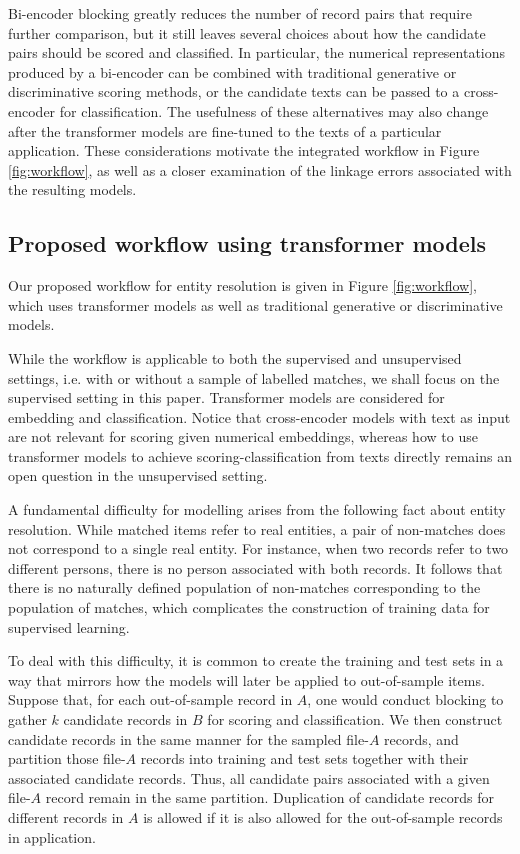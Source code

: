 Bi-encoder blocking greatly reduces the number of record pairs that require further comparison, but it still leaves several choices about how the candidate pairs should be scored and classified. In particular, the numerical representations produced by a bi-encoder can be combined with traditional generative or discriminative scoring methods, or the candidate texts can be passed to a cross-encoder for classification. The usefulness of these alternatives may also change after the transformer models are fine-tuned to the texts of a particular application. These considerations motivate the integrated workflow in Figure \ref{fig:workflow}, as well as a closer examination of the linkage errors associated with the resulting models.


\subsection{Proposed workflow using transformer models}
\label{sec:proposal}

Our proposed workflow for entity resolution is given in Figure \ref{fig:workflow}, which uses transformer models as well as traditional generative or discriminative models.

While the workflow is applicable to both the supervised and unsupervised settings, i.e. with or without a sample of labelled matches, we shall focus on the supervised setting in this paper. Transformer models are considered for embedding and classification. Notice that cross-encoder models with text as input are not relevant for scoring given numerical embeddings, whereas how to use transformer models to achieve scoring-classification from texts directly remains an open question in the unsupervised setting.

A fundamental difficulty for modelling arises from the following fact about entity resolution. While matched items refer to real entities, a pair of non-matches does not correspond to a single real entity. For instance, when two records refer to two different persons, there is no person associated with both records. It follows that there is no naturally defined population of non-matches corresponding to the population of matches, which complicates the construction of training data for supervised learning.

To deal with this difficulty, it is common to create the training and test sets in a way that
mirrors how the models will later be applied to out-of-sample items. Suppose that, for each
out-of-sample record in $A$, one would conduct blocking to gather $k$ candidate records in
$B$ for scoring and classification. We then construct candidate records in the same manner
for the sampled file-$A$ records, and partition those file-$A$ records into training and test
sets together with their associated candidate records. Thus, all candidate pairs associated
with a given file-$A$ record remain in the same partition. Duplication of candidate records
for different records in $A$ is allowed if it is also allowed for the out-of-sample records in
application.

